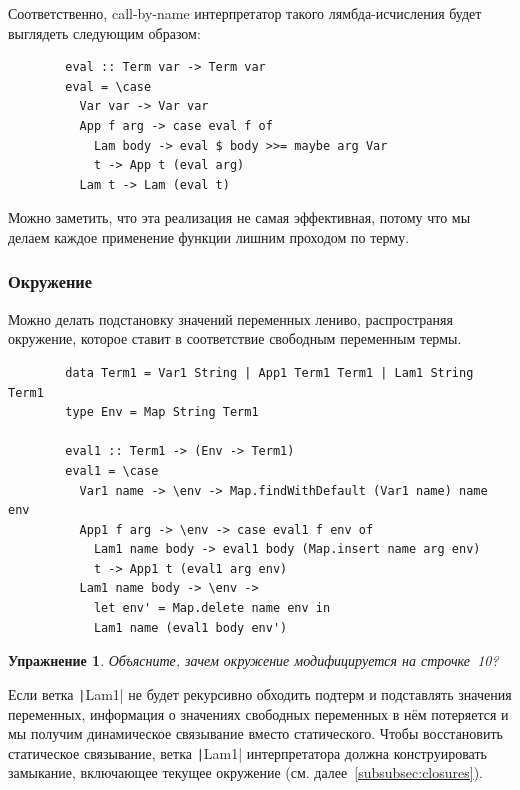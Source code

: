 \documentclass[12pt]{article}
\newtheorem{task}{Упражнение}
\begin{document}
    Соответственно, call-by-name интерпретатор такого лямбда-исчисления будет выглядеть следующим образом:

    \begin{verbatim}
        eval :: Term var -> Term var
        eval = \case
          Var var -> Var var
          App f arg -> case eval f of
            Lam body -> eval $ body >>= maybe arg Var
            t -> App t (eval arg)
          Lam t -> Lam (eval t)
    \end{verbatim}

    Можно заметить, что эта реализация не самая эффективная, потому что мы делаем каждое применение функции лишним проходом по терму.

    \subsubsection{Окружение}

    Можно делать подстановку значений переменных лениво, распространяя окружение, которое ставит в соответствие свободным переменным термы.

    \begin{verbatim}
        data Term1 = Var1 String | App1 Term1 Term1 | Lam1 String Term1
        type Env = Map String Term1

        eval1 :: Term1 -> (Env -> Term1)
        eval1 = \case
          Var1 name -> \env -> Map.findWithDefault (Var1 name) name env
          App1 f arg -> \env -> case eval1 f env of
            Lam1 name body -> eval1 body (Map.insert name arg env)
            t -> App1 t (eval1 arg env)
          Lam1 name body -> \env ->
            let env' = Map.delete name env in
            Lam1 name (eval1 body env')
    \end{verbatim}

    \begin{task}
        Объясните, зачем окружение модифицируется на строчке~10?
    \end{task}

    Если ветка \texttt|Lam1| не будет рекурсивно обходить подтерм и подставлять значения переменных, информация о значениях свободных переменных в нём потеряется и мы получим динамическое связывание вместо статического.
    Чтобы восстановить статическое связывание, ветка \texttt|Lam1| интерпретатора должна конструировать замыкание, включающее текущее окружение (см. далее~\ref{subsubsec:closures}).
\end{document}
